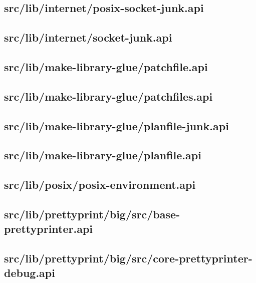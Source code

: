 \subsection{src/lib/internet/posix-socket-junk.api}


\subsection{src/lib/internet/socket-junk.api}


\subsection{src/lib/make-library-glue/patchfile.api}


\subsection{src/lib/make-library-glue/patchfiles.api}


\subsection{src/lib/make-library-glue/planfile-junk.api}


\subsection{src/lib/make-library-glue/planfile.api}


\subsection{src/lib/posix/posix-environment.api}


\subsection{src/lib/prettyprint/big/src/base-prettyprinter.api}


\subsection{src/lib/prettyprint/big/src/core-prettyprinter-debug.api}


